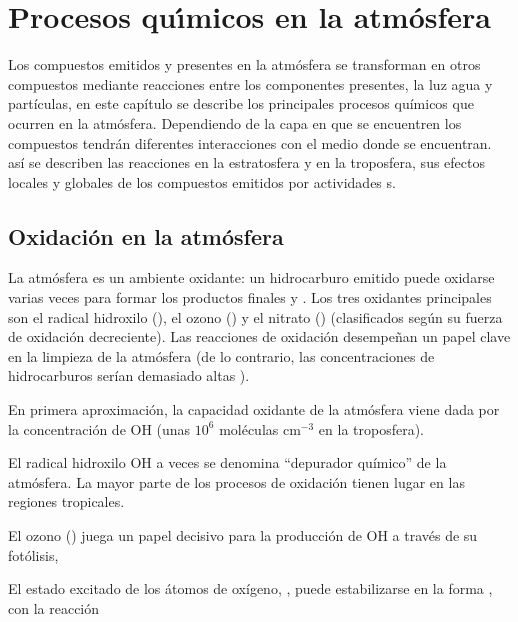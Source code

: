 %
\chapter{Procesos qu\'{\i}micos en la atm\'osfera}

Los compuestos emitidos y presentes en la atmósfera se transforman en otros compuestos mediante reacciones entre los componentes presentes, la luz  agua y partículas, en este capítulo se describe los principales procesos químicos que ocurren en la atmósfera. Dependiendo de la capa en que se encuentren los compuestos tendrán diferentes interacciones con el medio donde se encuentran. así se describen las reacciones en la estratosfera y en la troposfera, sus efectos locales y globales de los compuestos emitidos por actividades s.

\section{Oxidación en la atmósfera}

La atmósfera es un ambiente oxidante: un hidrocarburo emitido puede oxidarse varias veces para formar los productos finales  y . Los tres oxidantes principales son el radical hidroxilo (), el ozono () y el nitrato () (clasificados según su fuerza de oxidación decreciente).  Las reacciones de oxidación desempeñan un papel clave en la limpieza de la atmósfera (de lo contrario, las concentraciones de hidrocarburos serían demasiado altas ).

En primera aproximación, la capacidad oxidante de la atmósfera viene dada por la concentración de OH (unas $10^6$ moléculas cm${^{-3}}$ en la troposfera).

El radical hidroxilo OH a veces se denomina “depurador químico” de la atmósfera. La mayor parte de los procesos de oxidación tienen lugar en las regiones tropicales.

El ozono ()  juega un papel decisivo para la producción de OH a través de su fotólisis,


El estado excitado de los átomos de oxígeno, , puede estabilizarse en la forma , con la reacción


